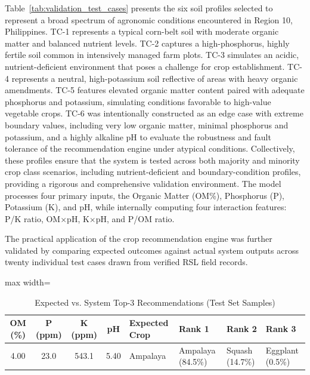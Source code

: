 {	Table~\ref{tab:validation_test_cases} presents the six soil profiles selected to represent a broad spectrum of agronomic conditions encountered in Region 10, Philippines. TC-1 represents a typical corn-belt soil with moderate organic matter and balanced nutrient levels. TC-2 captures a high-phosphorus, highly fertile soil common in intensively managed farm plots. TC-3 simulates an acidic, nutrient-deficient environment that poses a challenge for crop establishment. TC-4 represents a neutral, high-potassium soil reflective of areas with heavy organic amendments. TC-5 features elevated organic matter content paired with adequate phosphorus and potassium, simulating conditions favorable to high-value vegetable crops. TC-6 was intentionally constructed as an edge case with extreme boundary values, including very low organic matter, minimal phosphorus and potassium, and a highly alkaline pH to evaluate the robustness and fault tolerance of the recommendation engine under atypical conditions. Collectively, these profiles ensure that the system is tested across both majority and minority crop class scenarios, including nutrient-deficient and boundary-condition profiles, providing a rigorous and comprehensive validation environment. The model processes four primary inputs, the Organic Matter (OM\%), Phosphorus (P), Potassium (K), and pH, while internally computing four interaction features: P/K ratio, OM$\times$pH, K$\times$pH, and P/OM ratio.
	
	The practical application of the crop recommendation engine was further validated by comparing expected outcomes against actual system outputs across twenty individual test cases drawn from verified RSL field records.
	
\begin{table}[H]
	\centering
	\caption{Expected vs. System Top-3 Recommendations (Test Set Samples)}
	\label{tab:top3_recommendations}
	
	\scriptsize
	\renewcommand{\arraystretch}{1.2}
	
	\begin{adjustbox}{max width=\textwidth}
		\begin{tabular}{c c c c l l l l}
			\toprule
			\textbf{OM (\%)} & \textbf{P (ppm)} & \textbf{K (ppm)} & \textbf{pH} & \textbf{Expected Crop} & \textbf{Rank 1} & \textbf{Rank 2} & \textbf{Rank 3} \\
			\midrule
			
			4.00 & 23.0 & 543.1 & 5.40 & Ampalaya & Ampalaya (84.5\%) & Squash (14.7\%) & Eggplant (0.5\%) \\
			

\end{tabular}
\end{adjustbox}
\end{table}}
